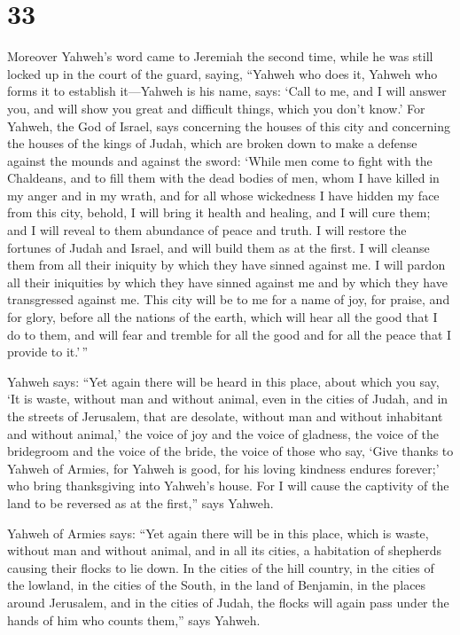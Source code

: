 \hypertarget{section-32}{%
\section{33}\label{section-32}}

 Moreover Yahweh's word came to Jeremiah the second time,
while he was still locked up in the court of the guard, saying,
 ``Yahweh who does it, Yahweh who forms it to establish
it---Yahweh is his name, says:  `Call to me, and I will
answer you, and will show you great and difficult things, which you
don't know.'  For Yahweh, the God of Israel, says concerning
the houses of this city and concerning the houses of the kings of Judah,
which are broken down to make a defense against the mounds and against
the sword:  `While men come to fight with the Chaldeans, and
to fill them with the dead bodies of men, whom I have killed in my anger
and in my wrath, and for all whose wickedness I have hidden my face from
this city,  behold, I will bring it health and healing, and
I will cure them; and I will reveal to them abundance of peace and
truth.  I will restore the fortunes of Judah and Israel, and
will build them as at the first.  I will cleanse them from
all their iniquity by which they have sinned against me. I will pardon
all their iniquities by which they have sinned against me and by which
they have transgressed against me.  This city will be to me
for a name of joy, for praise, and for glory, before all the nations of
the earth, which will hear all the good that I do to them, and will fear
and tremble for all the good and for all the peace that I provide to
it.'\,''

 Yahweh says: ``Yet again there will be heard in this
place, about which you say, `It is waste, without man and without
animal, even in the cities of Judah, and in the streets of Jerusalem,
that are desolate, without man and without inhabitant and without
animal,'  the voice of joy and the voice of gladness, the
voice of the bridegroom and the voice of the bride, the voice of those
who say, `Give thanks to Yahweh of Armies, for Yahweh is good, for his
loving kindness endures forever;' who bring thanksgiving into Yahweh's
house. For I will cause the captivity of the land to be reversed as at
the first,'' says Yahweh.

 Yahweh of Armies says: ``Yet again there will be in this
place, which is waste, without man and without animal, and in all its
cities, a habitation of shepherds causing their flocks to lie down.
 In the cities of the hill country, in the cities of the
lowland, in the cities of the South, in the land of Benjamin, in the
places around Jerusalem, and in the cities of Judah, the flocks will
again pass under the hands of him who counts them,'' says Yahweh.

